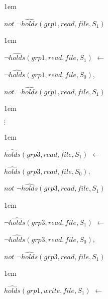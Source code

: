 \documentclass[global,twocolumn,final]{svjour}
\newenvironment{vexample}
  {\begin{example}\hspace{0.25em}}
  {\end{example}}
\newenvironment{vquote}
  {\begin{list}{}{\leftmargin 1em}\item[]}
  {\end{list}}
\begin{document}
\begin{vexample}
\begin{enumerate}
\begin{vquote}
                \hspace{1em}
                $not$ $\lnot\hat{holds}(grp1, read, file, S_{1})$
              \end{vquote}

              \begin{vquote}
                $\lnot\hat{holds}(grp1, read, file, S_{1})$ $\leftarrow$

                \hspace{1em}
                $\lnot\hat{holds}(grp1, read, file, S_{0})$,

                \hspace{1em}
                $not$ $\lnot\hat{holds}(grp1, read, file, S_{1})$
              \end{vquote}

              \begin{vquote}
                \hspace{2em}$\vdots$
              \end{vquote}

              \begin{vquote}
                $\hat{holds}(grp3, read, file, S_{1})$ $\leftarrow$

                \hspace{1em}
                $\hat{holds}(grp3, read, file, S_{0})$,

                \hspace{1em}
                $not$ $\lnot\hat{holds}(grp3, read, file, S_{1})$
              \end{vquote}

              \begin{vquote}
                $\lnot\hat{holds}(grp3, read, file, S_{1})$ $\leftarrow$

                \hspace{1em}
                $\lnot\hat{holds}(grp3, read, file, S_{0})$,

                \hspace{1em}
                $not$ $\lnot\hat{holds}(grp3, read, file, S_{1})$
              \end{vquote}

              \begin{vquote}
                $\hat{holds}(grp1, write, file, S_{1})$ $\leftarrow$


\end{vquote}
\end{enumerate}
\end{vexample}
\end{document}
